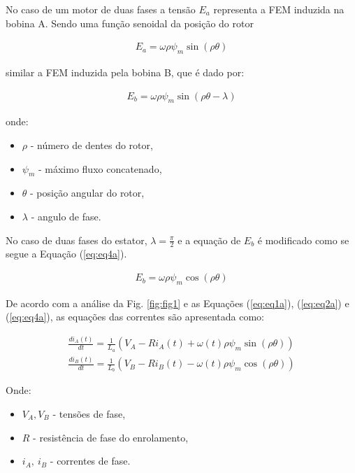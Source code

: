 No caso de um motor de duas fases a tensão $E_a$ representa a FEM induzida na bobina A. Sendo uma função senoidal da posição do rotor

\begin{eqnarray}
	\label{eq:eq2a}
	E_a = \omega \rho \psi_m \sin(\rho \theta)
\end{eqnarray}

similar a FEM induzida pela bobina B, que é dado por:

\begin{eqnarray}
		\label{eq:eq3a}
		E_b = \omega \rho \psi_m \sin(\rho \theta - \lambda)
\end{eqnarray}

onde:

\begin{itemize}
	\item $\rho$ - número de dentes do rotor,
	\item $\psi_m$ - máximo fluxo concatenado, 	\item $\theta$ - posição angular do rotor,
	\item $\lambda$ - angulo de fase.
\end{itemize}

No caso de duas fases do estator, $\lambda = \frac{\pi}{2}$ e a equação de $E_b$ é modificado como se segue a Equação (\ref{eq:eq4a}).

\begin{eqnarray}
		\label{eq:eq4a}
		E_b = \omega \rho \psi_m \cos(\rho \theta )
\end{eqnarray}

De acordo com a análise da Fig. \ref{fig:fig1} e as Equações (\ref{eq:eq1a}), (\ref{eq:eq2a}) e (\ref{eq:eq4a}), as equações das correntes são apresentada como:

\begin{eqnarray}
	\label{eq:eq5a}
	\frac{d i_A(t)}{dt} = \frac{1}{L_a}\left(V_A - Ri_A(t) + \omega(t) \rho \psi_m \sin(\rho \theta) \right) \\
	\label{eq:eq5b}
	\frac{d i_B(t)}{dt} = \frac{1}{L_b}\left(V_B - Ri_B(t) - \omega(t) \rho \psi_m \cos(\rho \theta) \right) 
\end{eqnarray}

Onde:

\begin{itemize}
	\item $V_A, V_B$ - tensões de fase,
	\item $R$ - resistência de fase do enrolamento,
	\item $i_A,\ i_B$ - correntes de fase.
\end{itemize}

